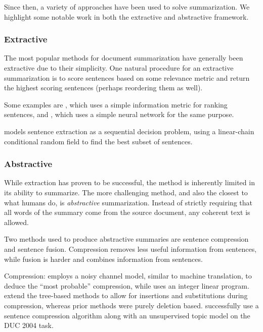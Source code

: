 \documentclass[11pt]{report}
\begin{document}
Since then, a variety of approaches have been used to solve summarization. We highlight some notable work in both the extractive and abstractive framework.

\subsubsection{Extractive}

The most popular methods for document summarization have generally been extractive due to their simplicity. One natural procedure for an extractive summarization is to score sentences based on some relevance metric and return the highest scoring sentences (perhaps reordering them as well).

Some examples are \cite{carbonell1998MMR}, which uses a simple information metric for ranking sentences, and \cite{svore2007}, which uses a simple neural network for the same purpose.

\citet{Shen2004} models sentence extraction as a sequential decision problem, using a linear-chain conditional random field to find the best subset of sentences.



\subsubsection{Abstractive}

While extraction has proven to be successful, the method is inherently limited in its ability to summarize. The more challenging method, and also the closest to what humans do, is \emph{abstractive} summarization. Instead of strictly requiring that all words of the summary come from the source document, any coherent text is allowed.

Two methods used to produce abstractive summaries are sentence compression and sentence fusion. Compression removes less useful information from sentences, while fusion is harder and combines information from sentences. %

Compression: \citet{knight2002summarization} employs a noisy channel model, similar to machine translation, to deduce the ``most probable'' compression, while \citet{clarke2008global} uses an integer linear program. \citet{cohn2008sentence} extend the tree-based methods to allow for insertions and substitutions during compression, whereas prior methods were purely deletion based. \cite{zajic2004topiary} successfully use a sentence compression algorithm along with an unsupervised topic model on the DUC 2004 task.
\end{document}
